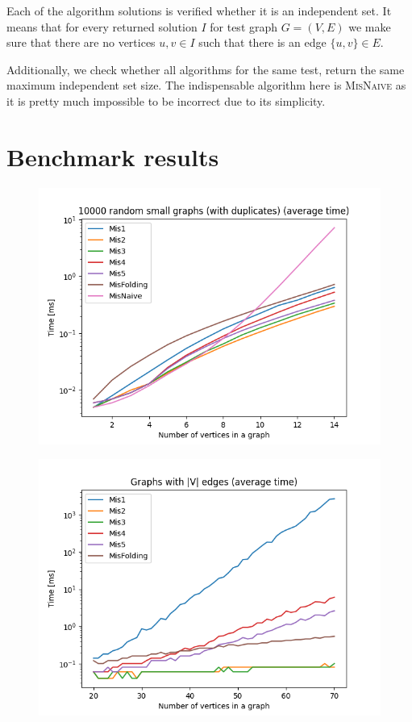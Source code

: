 Each of the algorithm solutions is verified whether it is an independent set. It means that for every returned solution $I$ for test graph $G = (V, E)$ we make sure that there are no vertices $u,v\in I$ such that there is an edge $\{u,v\} \in E$.

Additionally, we check whether all algorithms for the same test, return the same maximum independent set size. The indispensable algorithm here is \textsc{MisNaive} as it is pretty much impossible to be incorrect due to its simplicity.

\clearpage

\section{Benchmark results}

\begin{figure}[H]
\includegraphics[width=\textwidth]{4_benchmark/plots/small.png}
\centering
\end{figure}

\begin{figure}[H]
\vspace{-1cm}
\includegraphics[width=\textwidth]{4_benchmark/plots/1n.png}
\centering
\end{figure}

